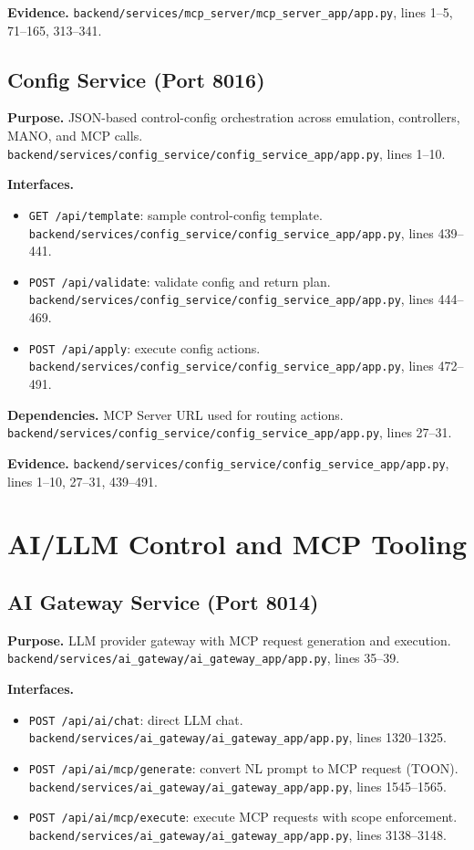 \documentclass[conference]{IEEEtran}
\begin{document}
\textbf{Evidence.} \texttt{backend/services/mcp\_server/mcp\_server\_app/app.py}, lines 1--5, 71--165, 313--341.

\subsection{Config Service (Port 8016)}
\textbf{Purpose.} JSON-based control-config orchestration across emulation, controllers, MANO, and MCP calls. \texttt{backend/services/config\_service/config\_service\_app/app.py}, lines 1--10.

\textbf{Interfaces.}
\begin{itemize}
\item \texttt{GET /api/template}: sample control-config template. \texttt{backend/services/config\_service/config\_service\_app/app.py}, lines 439--441.
\item \texttt{POST /api/validate}: validate config and return plan. \texttt{backend/services/config\_service/config\_service\_app/app.py}, lines 444--469.
\item \texttt{POST /api/apply}: execute config actions. \texttt{backend/services/config\_service/config\_service\_app/app.py}, lines 472--491.
\end{itemize}

\textbf{Dependencies.} MCP Server URL used for routing actions. \texttt{backend/services/config\_service/config\_service\_app/app.py}, lines 27--31.

\textbf{Evidence.} \texttt{backend/services/config\_service/config\_service\_app/app.py}, lines 1--10, 27--31, 439--491.

\section{AI/LLM Control and MCP Tooling}

\subsection{AI Gateway Service (Port 8014)}
\textbf{Purpose.} LLM provider gateway with MCP request generation and execution. \texttt{backend/services/ai\_gateway/ai\_gateway\_app/app.py}, lines 35--39.

\textbf{Interfaces.}
\begin{itemize}
\item \texttt{POST /api/ai/chat}: direct LLM chat. \texttt{backend/services/ai\_gateway/ai\_gateway\_app/app.py}, lines 1320--1325.
\item \texttt{POST /api/ai/mcp/generate}: convert NL prompt to MCP request (TOON). \texttt{backend/services/ai\_gateway/ai\_gateway\_app/app.py}, lines 1545--1565.
\item \texttt{POST /api/ai/mcp/execute}: execute MCP requests with scope enforcement. \texttt{backend/services/ai\_gateway/ai\_gateway\_app/app.py}, lines 3138--3148.
\end{itemize}
\end{document}
